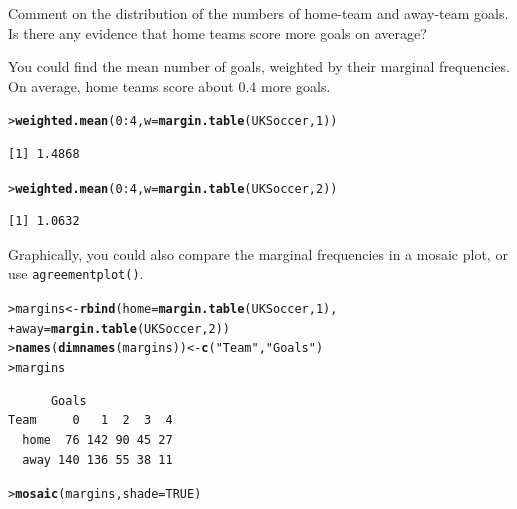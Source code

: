\documentclass[11pt]{report}\usepackage[]{graphicx}\usepackage[]{color}
\makeatletter
\newcommand{\hlnum}[1]{\textcolor[rgb]{0.686,0.059,0.569}{#1}}%
\newcommand{\hlstr}[1]{\textcolor[rgb]{0.192,0.494,0.8}{#1}}%
\newcommand{\hlopt}[1]{\textcolor[rgb]{0,0,0}{#1}}%
\newcommand{\hlstd}[1]{\textcolor[rgb]{0.345,0.345,0.345}{#1}}%
\newcommand{\hlkwb}[1]{\textcolor[rgb]{0.69,0.353,0.396}{#1}}%
\newcommand{\hlkwc}[1]{\textcolor[rgb]{0.333,0.667,0.333}{#1}}%
\newcommand{\hlkwd}[1]{\textcolor[rgb]{0.737,0.353,0.396}{\textbf{#1}}}%
\newenvironment{kframe}{%
 \def\at@end@of@kframe{}%
 \ifinner\ifhmode%
  \def\at@end@of@kframe{\end{minipage}}%
  \begin{minipage}{\columnwidth}%
 \fi\fi%
 \def\FrameCommand##1{\hskip\@totalleftmargin \hskip-\fboxsep
 \colorbox{shadecolor}{##1}\hskip-\fboxsep
     \hskip-\linewidth \hskip-\@totalleftmargin \hskip\columnwidth}%
 \MakeFramed {\advance\hsize-\width
   \@totalleftmargin\z@ \linewidth\hsize
   \@setminipage}}%
 {\par\unskip\endMakeFramed%
 \at@end@of@kframe}
\newenvironment{knitrout}{}{} %
\renewenvironment{knitrout}{\small\renewcommand{\baselinestretch}{.85}}{} %
\makeatother
\begin{document}
\begin{Exercises}
\begin{enumerate*}
    \item Comment on the distribution of the numbers of home-team and away-team
    goals.  Is there any evidence that home teams score more goals on average?
    \begin{ans}
      You could find the mean number of goals, weighted by their marginal frequencies.
      On average, home teams score about 0.4 more goals.
\begin{knitrout}
\color{fgcolor}\begin{kframe}
\begin{alltt}
\hlstd{> }\hlkwd{weighted.mean}\hlstd{(}\hlnum{0}\hlopt{:}\hlnum{4}\hlstd{,} \hlkwc{w}\hlstd{=}\hlkwd{margin.table}\hlstd{(UKSoccer,}\hlnum{1}\hlstd{))}
\end{alltt}
\begin{verbatim}
[1] 1.4868
\end{verbatim}
\begin{alltt}
\hlstd{> }\hlkwd{weighted.mean}\hlstd{(}\hlnum{0}\hlopt{:}\hlnum{4}\hlstd{,} \hlkwc{w}\hlstd{=}\hlkwd{margin.table}\hlstd{(UKSoccer,}\hlnum{2}\hlstd{))}
\end{alltt}
\begin{verbatim}
[1] 1.0632
\end{verbatim}
\end{kframe}
\end{knitrout}
      Graphically, you could also compare the marginal frequencies in a mosaic plot, or use \texttt{agreementplot()}.
\begin{knitrout}
\color{fgcolor}\begin{kframe}
\begin{alltt}
\hlstd{> }\hlstd{margins} \hlkwb{<-} \hlkwd{rbind}\hlstd{(}\hlkwc{home}\hlstd{=}\hlkwd{margin.table}\hlstd{(UKSoccer,}\hlnum{1}\hlstd{),}
\hlstd{+ }                 \hlkwc{away}\hlstd{=}\hlkwd{margin.table}\hlstd{(UKSoccer,}\hlnum{2}\hlstd{))}
\hlstd{> }\hlkwd{names}\hlstd{(}\hlkwd{dimnames}\hlstd{(margins))} \hlkwb{<-} \hlkwd{c}\hlstd{(}\hlstr{"Team"}\hlstd{,} \hlstr{"Goals"}\hlstd{)}
\hlstd{> }\hlstd{margins}
\end{alltt}
\begin{verbatim}
      Goals
Team     0   1  2  3  4
  home  76 142 90 45 27
  away 140 136 55 38 11
\end{verbatim}
\begin{alltt}
\hlstd{> }\hlkwd{mosaic}\hlstd{(margins,} \hlkwc{shade}\hlstd{=}\hlnum{TRUE}\hlstd{)}
\end{alltt}
\end{kframe}


\end{knitrout}
\end{ans}
\end{enumerate*}
\end{Exercises}
\end{document}
